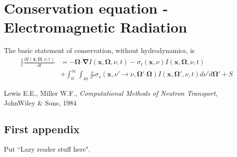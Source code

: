 \documentclass[10pt,letterpaper,notitlepage]{article}
\newcommand{\Omegabf}{\mathbf{\Omega}}
\newcommand{\bnabla}{\boldsymbol{\nabla}}
\newcommand{\position}{\mathbf{x}}
\newcommand{\dotp}{\boldsymbol{\cdot}}
\newcommand{\beqn}{\begin{equation}\begin{aligned}}
\newcommand{\eeqn}{\end{aligned}\end{equation}}
\begin{document}
\vspace{1cm}
\section{Conservation equation - Electromagnetic Radiation}
The basic statement of conservation, without hydrodynamics, is
\beqn 
\frac{1}{c} \frac{\partial I(\position, \Omegabf, \nu, t)}{\partial t} &=
-\Omegabf \dotp \bnabla I(\position, \Omegabf, \nu, t)
- \sigma_t(\position,\nu) I(\position, \Omegabf, \nu, t) \\
&+ \int_0^{\infty} \int_{4\pi} \frac{\nu}{\nu'} \sigma_s(\position,\nu'{\to}\nu,\Omegabf'{\dotp}\Omegabf) I(\position, \Omegabf', 
\nu, t)  d\nu' d\Omegabf'
+S
\eeqn 

\newpage
\begin{thebibliography}{1}
	
	 Lewis E.E., Miller W.F., {\em Computational Methods of Neutron Transport}, JohnWiley \& Sons, 1984
	   
\end{thebibliography}

\newpage
\begin{appendices}
\section{First appendix}
Put ``Lazy reader stuff here".
\end{appendices}
\end{document}
